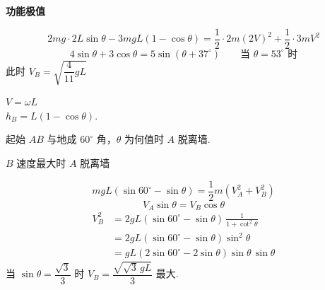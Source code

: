 \textbf{功能极值}

\begin{problem}[1、]
\begin{solution}
\[
2mg\cdot 2L\sin\theta-3mgL(1-\cos\theta)=\frac{1}{2}\cdot 2m(2V)^{2}+\frac{1}{2}\cdot 3mV^{2}
\]
\[
4\sin\theta+3\cos\theta=5\sin(\theta+37^\circ)\qquad \text{当 }\theta=53^\circ\text{ 时}
\]
此时 $V_B=\sqrt{\dfrac{4}{11}gL}$

\medskip
$V=\omega L$ %
\\
$h_B=L(1-\cos\theta)$.
\end{solution}
\end{problem}
\begin{problem}[2、]
起始 $AB$ 与地成 $60^\circ$ 角，$\theta$ 为何值时 $A$ 脱离墙.

$B$ 速度最大时 $A$ 脱离墙
\begin{solution}
\[
mgL(\sin60^\circ-\sin\theta)=\frac{1}{2}m(V_A^{2}+V_B^{2})
\]
\[
V_A\sin\theta=V_B\cos\theta
\]
\begin{align*}
V_B^{2}&=2gL(\sin60^\circ-\sin\theta)\,\frac{1}{1+\cot^{2}\theta}\\
&=2gL(\sin60^\circ-\sin\theta)\sin^{2}\theta\\
&=gL(2\sin60^\circ-2\sin\theta)\sin\theta\,\sin\theta
\end{align*}
当 $\sin\theta=\dfrac{\sqrt{3}}{3}$ 时 $V_B=\dfrac{\sqrt{\sqrt{3}\,gL}}{3}$ 最大.
\end{solution}
\end{problem}
